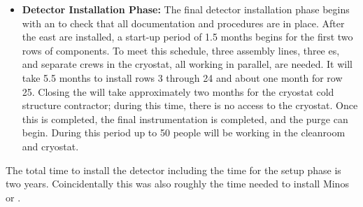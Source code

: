\begin{itemize}
    \item {\bf Detector Installation Phase:} The final detector installation phase begins with an  to check that all documentation and procedures are in place. After the east  are installed, a start-up period of 1.5 months begins for the first two rows of  components.  To meet this schedule, three assembly lines, three \coldbox{}es, and separate crews in the cryostat, all working in parallel, are needed.  It will take 5.5 months to install rows 3 through 24 and about one month for row 25. Closing the  will take approximately two months for the cryostat cold structure contractor; during this time, there is no access to the cryostat.  Once this is completed, the final instrumentation is completed, and the purge can begin. During this period up to 50 people will be working in the cleanroom and cryostat.
    
\end{itemize}

The total time to install the detector including the time for the setup phase is two years. Coincidentally this was also roughly the time needed to install Minos or .

  








